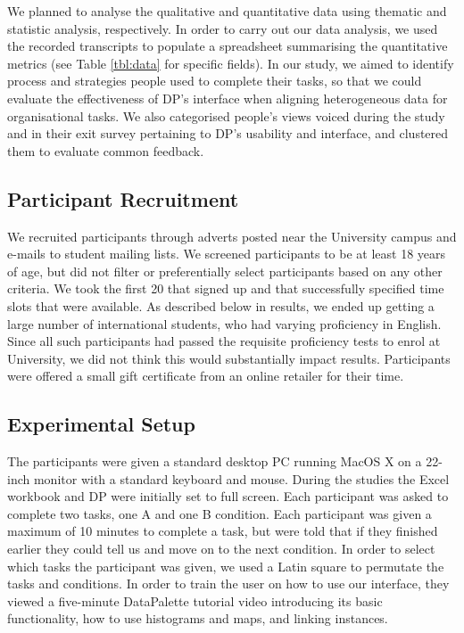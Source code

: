 \documentclass{sigchi}
\begin{document}
We planned to analyse the qualitative and quantitative data using thematic and statistic analysis, respectively.  In order to carry out our data analysis, we used the recorded transcripts to populate a spreadsheet summarising the quantitative metrics (see Table \ref{tbl:data} for specific fields).  In our study, we aimed to identify process and strategies people used to complete their tasks, so that we could evaluate the effectiveness of DP's interface when aligning heterogeneous data for organisational tasks.  We also categorised people's views voiced during the study and in their exit survey pertaining to DP's usability and interface, and clustered them to evaluate common feedback.

\subsection{Participant Recruitment}
We recruited participants through adverts posted near the University campus and e-mails to student mailing lists.  We screened participants to be at least 18 years of age, but did not filter or preferentially select participants based on any other criteria.  We took the first 20 that signed up and that successfully specified time slots that were available.   As described below in results, we ended up getting a large number of international students, who had varying proficiency in English.  Since all such participants had passed the requisite proficiency tests to enrol at University, we did not think this would substantially impact results.  Participants were offered a small gift certificate from an online retailer for their time. 

\subsection{Experimental Setup}
The participants were given a standard desktop PC running MacOS X on a 22-inch monitor with a standard keyboard and mouse.  During the studies the Excel workbook and DP were initially set to full screen.  Each participant was asked to complete two tasks, one A and one B condition.  Each participant was given a maximum of 10 minutes to complete a task, but were told that if they finished earlier they could tell us and move on to the next condition.  In order to select which tasks the participant was given, we used a Latin square to permutate the tasks and conditions.  In order to train the user on how to use our interface, they viewed a five-minute DataPalette tutorial video introducing its basic functionality, how to use histograms and maps, and linking instances.
\end{document}
